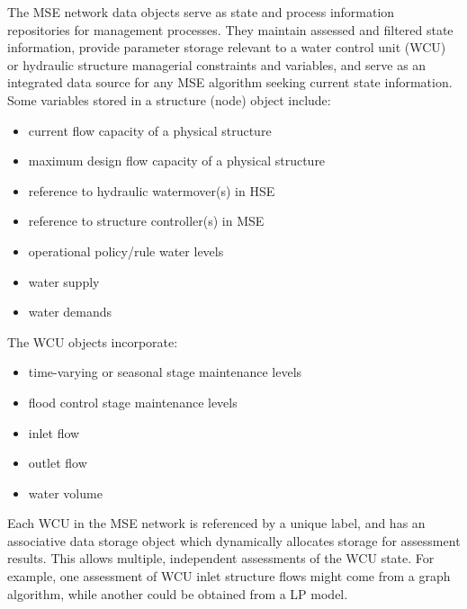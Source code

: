 The MSE network data objects serve as state and process information
repositories for management processes. They maintain assessed and
filtered state information, provide parameter storage relevant to a
water control unit (WCU) or hydraulic structure managerial constraints
and variables, and serve as an integrated data source for any MSE
algorithm seeking current state information. Some variables stored in
a structure (node) object include:

\begin{itemize}
 \item current flow capacity of a physical structure
 \item maximum design flow capacity of a physical structure
 \item reference to hydraulic watermover(s) in HSE
 \item reference to structure controller(s) in MSE
 \item operational policy/rule water levels
 \item water supply
 \item water demands
\end{itemize}

The WCU objects incorporate:
\begin{itemize}
 \item time-varying or seasonal stage maintenance levels
 \item flood control stage maintenance levels
 \item inlet flow
 \item outlet flow
 \item water volume
\end{itemize}

Each WCU in the MSE network is referenced by a unique label, and has
an associative data storage object which dynamically allocates storage
for assessment results. This allows multiple, independent assessments
of the WCU state. For example, one assessment of WCU inlet structure
flows might come from a graph algorithm, while another could be
obtained from a LP model.

